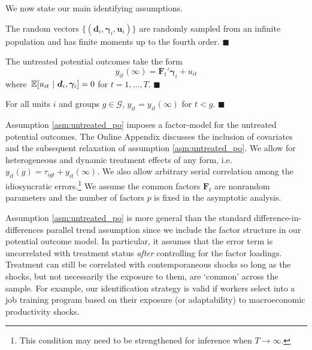 We now state our main identifying assumptions.
\begin{assumption}\label{asm:sampling}
The random vectors $\{ (\bm d_i, \bm \gamma_i, \bm u_i) \}$ are randomly sampled from an infinite population and has finite moments up to the fourth order. $\blacksquare$
\end{assumption}

\begin{assumption}\label{asm:untreated_po}
The untreated potential outcomes take the form
\begin{equation*}
  y_{it}(\infty) = \bm{F}_t' \bm \gamma_i + u_{it}
\end{equation*}
where $\expec{u_{it}}{\bm d_i, \bm \gamma_i} = 0$ for $t = 1,...,T$. $\blacksquare$
\end{assumption}

\begin{assumption}\label{asm:no_anticipation}
For all units $i$ and groups $g \in \mathcal{G}$, $y_{it} = y_{it}(\infty)$ for $t < g$. $\blacksquare$ %
\end{assumption}

Assumption \ref{asm:untreated_po} imposes a factor-model for the untreated potential outcomes. The Online Appendix discusses the inclusion of covariates and the subsequent relaxation of assumption \ref{asm:untreated_po}. We allow for heterogeneous and dynamic treatment effects of any form, i.e. $y_{it}(g) = \tau_{igt} + y_{it}(\infty)$. We also allow arbitrary serial correlation among the idiosyncratic errors.\footnote{This condition may need to be strengthened for inference when $T \rightarrow \infty$.} We assume the common factors $\bm{F}_t$ are nonrandom parameters and the number of factors $p$ is fixed in the asymptotic analysis. 

Assumption \ref{asm:untreated_po} is more general than the standard difference-in-differences parallel trend assumption since we include the factor structure in our potential outcome model. In particular, it assumes that the error term is uncorrelated with treatment status \textit{after} controlling for the factor loadings. Treatment can still be correlated with contemporaneous shocks so long as the shocks, but not necessarily the exposure to them, are `common' across the sample. For example, our identification strategy is valid if workers select into a job training program based on their exposure (or adaptability) to macroeconomic productivity shocks. 

